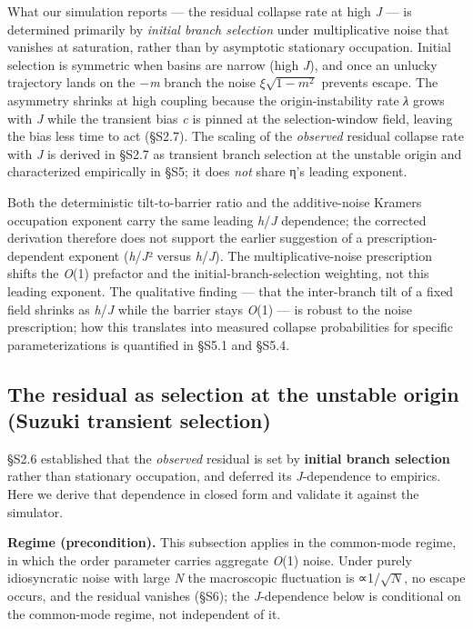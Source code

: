 \documentclass[11pt,letterpaper]{article}
\begin{document}
What our simulation reports --- the residual collapse rate at high \emph{J} --- is determined primarily by \emph{initial branch selection} under multiplicative noise that vanishes at saturation, rather than by asymptotic stationary occupation. Initial selection is symmetric when basins are narrow (high \emph{J}), and once an unlucky trajectory lands on the −\emph{m} branch the noise \(\xi \sqrt{1-m^2}\) prevents escape. The asymmetry shrinks at high coupling because the origin-instability rate \emph{λ} grows with \emph{J} while the transient bias \emph{c} is pinned at the selection-window field, leaving the bias less time to act (§S2.7). The scaling of the \emph{observed} residual collapse rate with \emph{J} is derived in §S2.7 as transient branch selection at the unstable origin and characterized empirically in §S5; it does \emph{not} share η's leading exponent.

Both the deterministic tilt-to-barrier ratio and the additive-noise Kramers occupation exponent carry the same leading \emph{h}/\emph{J} dependence; the corrected derivation therefore does not support the earlier suggestion of a prescription-dependent exponent (\emph{h}/\emph{J}² versus \emph{h}/\emph{J}). The multiplicative-noise prescription shifts the \emph{O}(1) prefactor and the initial-branch-selection weighting, not this leading exponent. The qualitative finding --- that the inter-branch tilt of a fixed field shrinks as \emph{h}/\emph{J} while the barrier stays \emph{O}(1) --- is robust to the noise prescription; how this translates into measured collapse probabilities for specific parameterizations is quantified in §S5.1 and §S5.4.

\subsection{The residual as selection at the unstable origin (Suzuki transient selection)}\label{the-residual-as-selection-at-the-unstable-origin-suzuki-transient-selection}

§S2.6 established that the \emph{observed} residual is set by \textbf{initial branch selection} rather than stationary occupation, and deferred its \emph{J}-dependence to empirics. Here we derive that dependence in closed form and validate it against the simulator.

\textbf{Regime (precondition).} This subsection applies in the common-mode regime, in which the order parameter carries aggregate \emph{O}(1) noise. Under purely idiosyncratic noise with large \emph{N} the macroscopic fluctuation is ∝1/\(\sqrt{N}\), no escape occurs, and the residual vanishes (§S6); the \emph{J}-dependence below is conditional on the common-mode regime, not independent of it.
\end{document}

